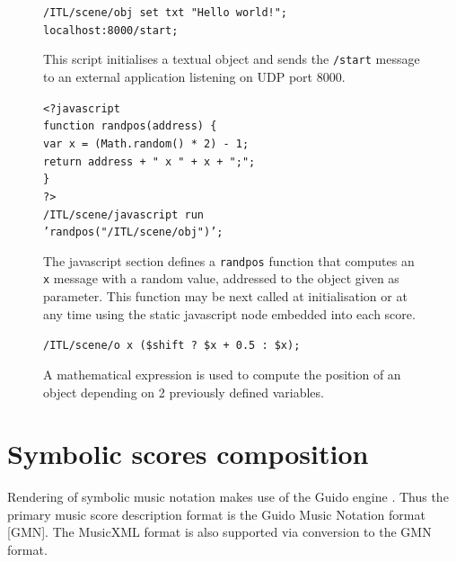 \documentclass[11pt,a4paper]{article}
\newcommand{\OSC}[1]	{{\fontsize{10pt}{10pt} \selectfont\texttt{#1}}}
\newcommand{\tab}		{\hspace*{4mm}}
\newcommand{\sample}[1]	{\vspace{-0.2em}\begin{center}\colorbox{mygrey}{\begin{minipage}[t]{0.98\columnwidth} {\small \texttt{#1}}\end{minipage}}\end{center}}
\begin{document}
\begin{figure}[ht]
\begin{center}
\sample{/ITL/scene/obj set txt "Hello world!"; \\
localhost:8000/start;
}
\caption{This script initialises a textual object and sends the \OSC{/start} message to an external application listening on UDP port 8000.}
\label{fig:eosc}
\end{center}
\end{figure}

\begin{figure}[ht]
\begin{center}
\sample{<?javascript \\
\tab function randpos(address) \{\\
\tab \tab var x = (Math.random() * 2) - 1;\\
\tab \tab return address + " x " + x + ";"; \\
\tab\}\\
?> \\
/ITL/scene/javascript run \\
\tab \tab \tab \tab 'randpos("/ITL/scene/obj")'; 
}
\caption{The javascript section defines a \OSC{randpos} function that computes an \OSC{x} message with a random value, addressed to the object given as parameter. This function may be next called at initialisation or at any time using the static javascript node embedded into each score.}
\label{fig:java}
\end{center}
\end{figure}

\begin{figure}[ht]
\begin{center}
\sample{/ITL/scene/o x (\$shift ? \$x + 0.5 : \$x);
}
\caption{A mathematical expression is used to compute the position of an object depending on 2 previously defined variables. }
\label{fig:math}
\end{center}
\end{figure}
 

\section{Symbolic scores composition}
\label{sec:scorecompo}

Rendering of symbolic music notation makes use of the Guido engine \cite{Dau:09b}. Thus the primary music score description format is the Guido Music Notation format \cite{hoos98} [GMN]. The MusicXML format \cite{good01} is also supported via conversion to the GMN format. 
\end{document}
